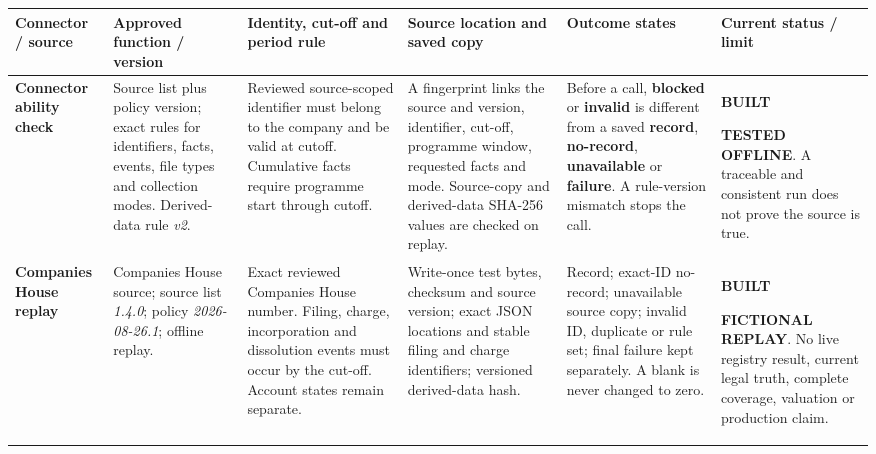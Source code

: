 \clearpage
\begin{table}[p]
  \centering
  \scriptsize
  \setlength{\tabcolsep}{2.0pt}
  \renewcommand{\arraystretch}{1.06}
  \begin{tabularx}{\textwidth}{@{}P{0.105\textwidth}P{0.135\textwidth}P{0.17\textwidth}P{0.17\textwidth}P{0.175\textwidth}Y@{}}
    \toprule
    \textbf{Connector / source} &
    \textbf{Approved function / version} &
    \textbf{Identity, cut-off and period rule} &
    \textbf{Source location and saved copy} &
    \textbf{Outcome states} &
    \textbf{Current status / limit} \\
    \midrule

    \textbf{Connector ability check} &
    Source list plus policy version; exact rules for identifiers, facts, events, file types and collection modes. Derived-data rule \emph{v2}. &
    Reviewed source-scoped identifier must belong to the company and be valid at cutoff. Cumulative facts require programme start through cutoff. &
    A fingerprint links the source and version, identifier, cut-off, programme window, requested facts and mode. Source-copy and derived-data SHA-256 values are checked on replay. &
    Before a call, \textbf{blocked} or \textbf{invalid} is different from a saved \textbf{record}, \textbf{no-record}, \textbf{unavailable} or \textbf{failure}. A rule-version mismatch stops the call. &
    \textbf{BUILT}\par\textbf{TESTED OFFLINE}. A traceable and consistent run does not prove the source is true. \\

    \addlinespace[1.5pt]
    \textbf{Companies House replay} &
    Companies House source; source list \emph{1.4.0}; policy \emph{2026-08-26.1}; offline replay. &
    Exact reviewed Companies House number. Filing, charge, incorporation and dissolution events must occur by the cut-off. Account states remain separate. &
    Write-once test bytes, checksum and source version; exact JSON locations and stable filing and charge identifiers; versioned derived-data hash. &
    Record; exact-ID no-record; unavailable source copy; invalid ID, duplicate or rule set; final failure kept separately. A blank is never changed to zero. &
    \textbf{BUILT}\par\textbf{FICTIONAL REPLAY}. No live registry result, current legal truth, complete coverage, valuation or production claim. \\


\end{tabularx}
\end{table}
